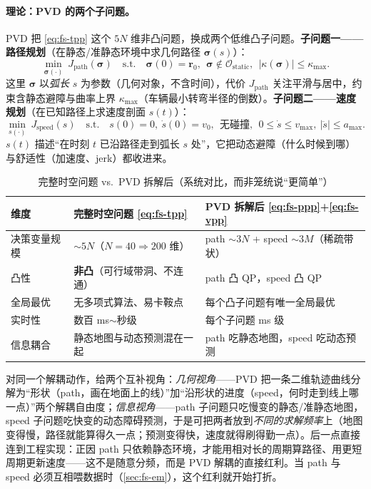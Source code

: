 \paragraph{理论：PVD 的两个子问题。}
PVD 把 \cref{eq:fs-tpp} 这个 $5N$ 维非凸问题，换成两个低维凸子问题。\textbf{子问题一——路径规划}（在静态/准静态环境中求几何路径 $\boldsymbol{\sigma}(s)$）：
\begin{equation}
  \min_{\boldsymbol{\sigma}(\cdot)}\ J_{\mathrm{path}}(\boldsymbol{\sigma})\quad\text{s.t.}\quad
  \boldsymbol{\sigma}(0)=\mathbf{r}_0,\ \ \boldsymbol{\sigma}\notin\mathcal{O}_{\mathrm{static}},\ \ |\kappa(\boldsymbol{\sigma})|\le\kappa_{\max}.
  \label{eq:fs-ppp}
\end{equation}
这里 $\boldsymbol{\sigma}$ 以\emph{弧长} $s$ 为参数（几何对象，不含时间），代价 $J_{\mathrm{path}}$ 关注平滑与居中，约束含静态避障与曲率上界 $\kappa_{\max}$（车辆最小转弯半径的倒数）。\textbf{子问题二——速度规划}（在已知路径上求速度剖面 $s(t)$）：
\begin{equation}
  \min_{s(\cdot)}\ J_{\mathrm{speed}}(s)\quad\text{s.t.}\quad
  s(0)=0,\ \dot s(0)=v_0,\ \ \text{无碰撞},\ \ 0\le\dot s\le v_{\max},\ |\ddot s|\le a_{\max}.
  \label{eq:fs-vpp}
\end{equation}
$s(t)$ 描述“在时刻 $t$ 已沿路径走到弧长 $s$ 处”，它把动态避障（什么时候到哪）与舒适性（加速度、jerk）都收进来。

\begin{table}[H]\centering\small
\caption{完整时空问题 vs.\ PVD 拆解后（系统对比，而非笼统说“更简单”）}
\label{tab:fs-pvd-cmp}
\begin{tabular}{lll}
\toprule
维度 & 完整时空问题 \cref{eq:fs-tpp} & PVD 拆解后 \cref{eq:fs-ppp}+\cref{eq:fs-vpp} \\
\midrule
决策变量规模 & $\sim5N$（$N{=}40\Rightarrow200$ 维） & path $\sim3N$ + speed $\sim3M$（稀疏带状） \\
凸性 & \textbf{非凸}（可行域带洞、不连通） & path 凸 QP，speed 凸 QP \\
全局最优 & 无多项式算法、易卡鞍点 & 每个凸子问题有唯一全局最优 \\
实时性 & 数百 ms$\sim$秒级 & 每个子问题 ms 级 \\
信息耦合 & 静态地图与动态预测混在一起 & path 吃静态地图，speed 吃动态预测 \\
\bottomrule
\end{tabular}
\end{table}

对同一个解耦动作，给两个互补视角：\emph{几何视角}——PVD 把一条二维轨迹曲线分解为“形状（path，画在地面上的线）”加“沿形状的进度（speed，何时走到线上哪一点）”两个解耦自由度；\emph{信息视角}——path 子问题只吃慢变的静态/准静态地图，speed 子问题吃快变的动态障碍预测，于是可把两者放到\emph{不同的求解频率}上（地图变得慢，路径就能算得久一点；预测变得快，速度就得刷得勤一点）。后一点直接连到工程实现：正因 path 只依赖静态环境，才能用相对长的周期算路径、用更短周期更新速度——这不是随意分频，而是 PVD 解耦的直接红利。当 path 与 speed 必须互相喂数据时（\cref{sec:fs-em}），这个红利就开始打折。

